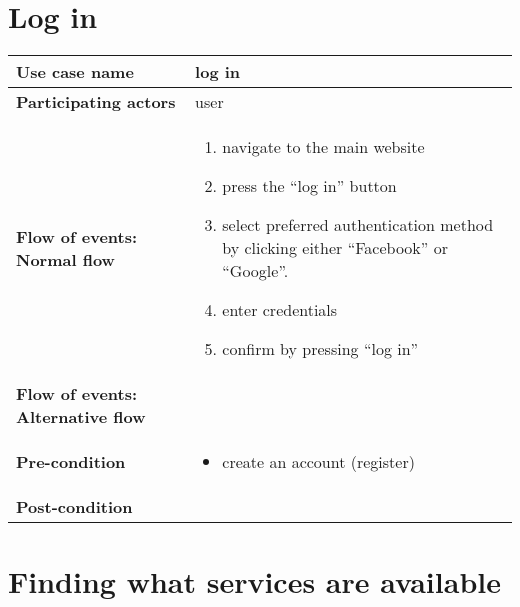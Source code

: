 \documentclass[a4paper, 13pt, draft]{report}
\begin{document}
\section*{Log in}

\begin{center}
    \begin{tabular}{| >{\bf}l | p{5.55cm} |} 
	\hline
	Use case name & log in \\ 
	\hline
	Participating actors & user \\
	\hline
	Flow of events: Normal flow & 
	\begin{enumerate}		
	    \item navigate to the main website
	    \item press the ``log in'' button
	    \item select preferred authentication method by clicking either ``Facebook'' or ``Google''.
	    \item enter credentials
	    \item confirm by pressing ``log in''
	\end{enumerate}	\\
	\hline
	Flow of events: Alternative flow & \notapplicable \\
	\hline
	Pre-condition & 
	\begin{itemize} 
	    \item create an account (register)
	\end{itemize} \\
	\hline
	Post-condition & \notapplicable \\
	\hline
    \end{tabular}
\end{center}

\section*{Finding what services are available}
\end{document}

